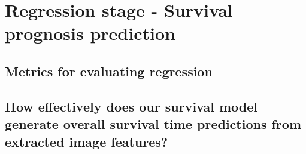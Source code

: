 \documentclass{l4proj}
\begin{document}
\section{Regression stage - Survival prognosis prediction}
\subsection{Metrics for evaluating regression}
\subsection{How effectively does our survival model generate overall survival time predictions from extracted image features?}





\end{document}
